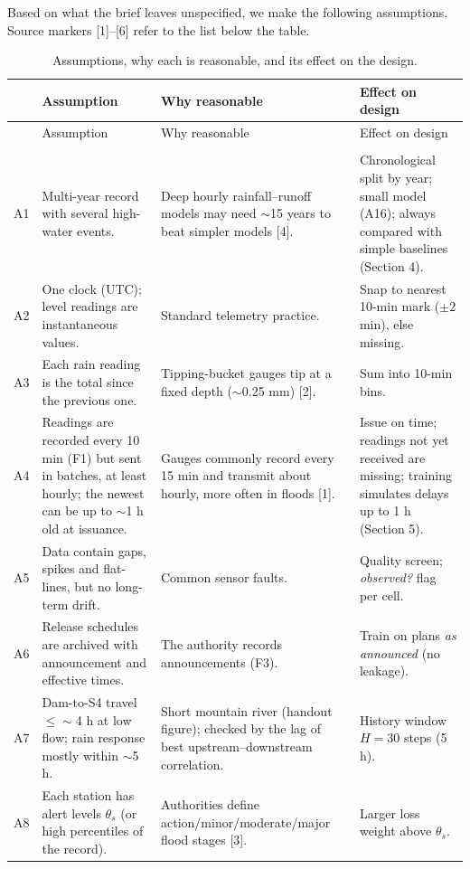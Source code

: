 Based on what the brief leaves unspecified, we make the following assumptions. Source markers [1]--[6] refer to the list below the table.

{\small
\begin{xltabular}{\linewidth}{@{}p{0.55cm}LLL@{}}
\caption{Assumptions, why each is reasonable, and its effect on the design.}\label{tab:q1assump}\\
\toprule
 & Assumption & Why reasonable & Effect on design\\
\midrule
\endfirsthead
\toprule
 & Assumption & Why reasonable & Effect on design\\
\midrule
\endhead
\bottomrule
\endlastfoot
{}\\
A1 & Multi-year record with several high-water events. & Deep hourly rainfall--runoff models may need $\sim$15 years to beat simpler models [4]. & Chronological split by year; small model (A16); always compared with simple baselines (Section 4).\\
A2 & One clock (UTC); level readings are instantaneous values. & Standard telemetry practice. & Snap to nearest 10-min mark ($\pm$2 min), else missing.\\
A3 & Each rain reading is the total since the previous one. & Tipping-bucket gauges tip at a fixed depth ($\sim$0.25 mm) [2]. & Sum into 10-min bins.\\
A4 & Readings are recorded every 10 min (F1) but sent in batches, at least hourly; the newest can be up to $\sim$1 h old at issuance. & Gauges commonly record every 15 min and transmit about hourly, more often in floods [1]. & Issue on time; readings not yet received are missing; training simulates delays up to 1 h (Section 5).\\
A5 & Data contain gaps, spikes and flat-lines, but no long-term drift. & Common sensor faults. & Quality screen; \emph{observed?} flag per cell.\\
A6 & Release schedules are archived with announcement and effective times. & The authority records announcements (F3). & Train on plans \emph{as announced} (no leakage).\\
A7 & Dam-to-S4 travel $\le\sim$4 h at low flow; rain response mostly within $\sim$5 h. & Short mountain river (handout figure); checked by the lag of best upstream--downstream correlation. & History window $H=30$ steps (5 h).\\
A8 & Each station has alert levels $\theta_s$ (or high percentiles of the record). & Authorities define action/minor/moderate/major flood stages [3]. & Larger loss weight above $\theta_s$.\\

\end{xltabular}}
